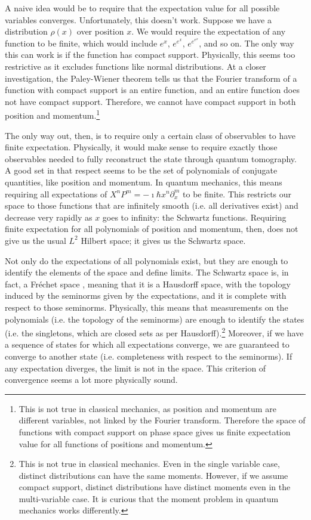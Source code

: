 \documentclass[10pt,twocolumn, nofootinbib]{revtex4-2}
\begin{document}
A naive idea would be to require that the expectation value for all possible variables converges. Unfortunately, this doesn't work. Suppose we have a distribution $\rho(x)$ over position $x$. We would require the expectation of any function to be finite, which would include $e^x$, $e^{e^x}$, $e^{e^{e^x}}$, and so on. The only way this can work is if the function has compact support. Physically, this seems too restrictive as it excludes functions like normal distributions. At a closer investigation, the Paley-Wiener theorem\cite{fourierCompact} tells us that the Fourier transform of a function with compact support is an entire function, and an entire function does not have compact support.\cite{markushevich2014entire} Therefore, we cannot have compact support in both position and momentum.\footnote{This is not true in classical mechanics, as position and momentum are different variables, not linked by the Fourier transform. Therefore the space of functions with compact support on phase space gives us finite expectation value for all functions of positions and momentum.}

The only way out, then, is to require only a certain class of observables to have finite expectation. Physically, it would make sense to require exactly those observables needed to fully reconstruct the state through quantum tomography. A good set in that respect seems to be the set of polynomials of conjugate quantities, like position and momentum. In quantum mechanics, this means requiring all expectations of $X^nP^m = -\imath \hbar x^n\partial_x ^m$ to be finite. This restricts our space to those functions that are infinitely smooth (i.e. all derivatives exist) and decrease very rapidly as $x$ goes to infinity: the Schwartz functions. Requiring finite expectation for all polynomials of position and momentum, then, does not give us the usual $L^2$ Hilbert space; it gives us the Schwartz space.

Not only do the expectations of all polynomials exist, but they are enough to identify the elements of the space and define limits. The Schwartz space is, in fact, a Fréchet space \cite[Theorem V.9]{reed_methods_1980}, meaning that it is a Hausdorff space, with the topology induced by the seminorms given by the expectations, and it is complete with respect to those seminorms. Physically, this means that measurements on the polynomials (i.e. the topology of the seminorms) are enough to identify the states (i.e. the singletons, which are closed sets as per Hausdorff).\footnote{This is not true in classical mechanics. Even in the single variable case, distinct distributions can have the same moments. However, if we assume compact support, distinct distributions have distinct moments even in the multi-variable case.\cite{moment_problem_2017} It is curious that the moment problem in quantum mechanics works differently.} Moreover, if we have a sequence of states for which all expectations converge, we are guaranteed to converge to another state (i.e. completeness with respect to the seminorms). If any expectation diverges, the limit is not in the space. This criterion of convergence seems a lot more physically sound.
\end{document}
